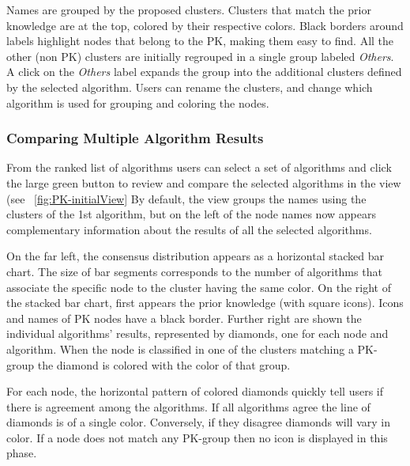 
Names are grouped by the proposed clusters. Clusters that match the prior knowledge are at the top, colored by their respective colors.  Black borders around labels highlight nodes that belong to the PK, making them easy to find.   All the other (non PK) clusters are initially regrouped in a single group labeled \textit{Others}.
A click on the \textit{Others} label expands the group into the additional clusters defined by the selected algorithm.
Users can rename the clusters, and change which algorithm is used for grouping and coloring the nodes.

\subsubsection{Comparing Multiple Algorithm Results}

From the ranked list of algorithms users can select a set of algorithms and click the large green button to review and compare the selected algorithms in the \paovis view (see ~\autoref{fig:PK-initialView}
By default, the \paovis view groups the names using the clusters of the 1st algorithm, but on the left of the node names now appears complementary information about the results of all the selected algorithms.

On the far left, the consensus distribution appears as a horizontal stacked bar chart. The size of bar segments corresponds to the number of algorithms that associate the specific node to the cluster having the same color. On the right of the stacked bar chart, first appears the prior knowledge (with square icons). Icons and names of PK nodes have a black border. Further right are shown the individual algorithms' results, represented by diamonds, one for each node and algorithm. When the node is classified in one of the clusters matching a PK-group the diamond is colored with the color of that group.


For each node, the horizontal pattern of colored diamonds quickly tell users if there is agreement among the algorithms. If all algorithms agree the line of diamonds is of a single color. Conversely, if they disagree diamonds will vary in color. If a node does not match any PK-group then no icon is displayed in this phase.

